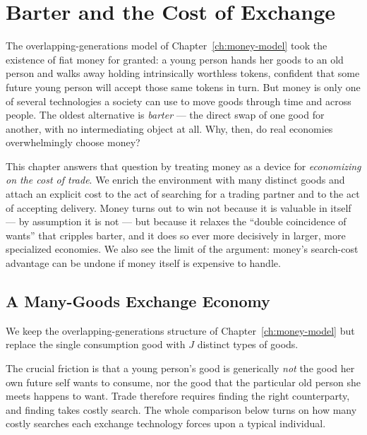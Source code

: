 \chapter{Barter and the Cost of Exchange}
\label{ch:barter}

The overlapping-generations model of Chapter~\ref{ch:money-model} took the existence of fiat money for granted: a young person hands her goods to an old person and walks away holding intrinsically worthless tokens, confident that some future young person will accept those same tokens in turn. But money is only one of several technologies a society can use to move goods through time and across people. The oldest alternative is \emph{barter} --- the direct swap of one good for another, with no intermediating object at all. Why, then, do real economies overwhelmingly choose money?

This chapter answers that question by treating money as a device for \emph{economizing on the cost of trade}. We enrich the environment with many distinct goods and attach an explicit cost to the act of searching for a trading partner and to the act of accepting delivery. Money turns out to win not because it is valuable in itself --- by assumption it is not --- but because it relaxes the ``double coincidence of wants'' that cripples barter, and it does so ever more decisively in larger, more specialized economies. We also see the limit of the argument: money's search-cost advantage can be undone if money itself is expensive to handle.

\section{A Many-Goods Exchange Economy}

We keep the overlapping-generations structure of Chapter~\ref{ch:money-model} but replace the single consumption good with $J$ distinct types of goods.


The crucial friction is that a young person's good is generically \emph{not} the good her own future self wants to consume, nor the good that the particular old person she meets happens to want. Trade therefore requires finding the right counterparty, and finding takes costly search. The whole comparison below turns on how many costly searches each exchange technology forces upon a typical individual.

